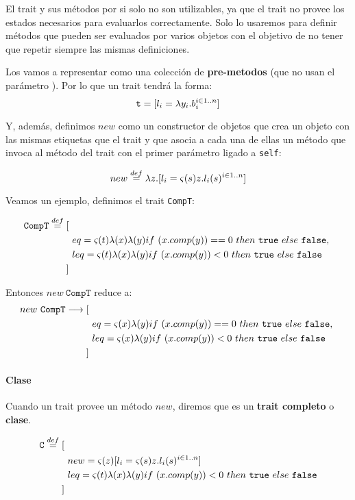 El trait y sus métodos por si solo no son utilizables, ya que el trait no provee los estados necesarios para evaluarlos correctamente. Solo lo usaremos para definir métodos que pueden ser evaluados por varios objetos con el objetivo de no tener que repetir siempre las mismas definiciones.

Los vamos a representar como una colección de \textbf{pre-metodos} (que no usan el parámetro ). Por lo que un trait tendrá la forma:
$$\texttt{t} = [l_i = \lambda y_i. b_i^{i\in 1..n}]$$

Y, además, definimos $new$ como un constructor de objetos que crea un objeto con las mismas etiquetas que el trait y que asocia a cada una de ellas un método que invoca al método del trait con el primer parámetro ligado a \texttt{self}:

$$new \overset{def}{=} \lambda z. [l_i = \varsigma(s)z.l_i(s)^{i\in 1..n}]$$

Veamos un ejemplo, definimos el trait \texttt{CompT}:

\begin{align*}
	\texttt{CompT}\overset{def}{=} [~& \\ &eq = \varsigma(t)\lambda(x)\lambda(y)if~ (x.comp(y)) == 0~ then~ \texttt{true}~ else~ \texttt{false},~\\
	&leq = \varsigma(t)\lambda(x)\lambda(y)if~ (x.comp(y)) < 0~ then~ \texttt{true}~ else~ \texttt{false} \\
	]~&
\end{align*}

Entonces $new~\texttt{CompT}$ reduce a:
\begin{align*}
new~\texttt{CompT}\longrightarrow [~& \\ &eq = \varsigma(x)\lambda(y)if~ (x.comp(y)) == 0~ then~ \texttt{true}~ else~ \texttt{false},~\\
&leq = \varsigma(x)\lambda(y)if~ (x.comp(y)) < 0~ then~ \texttt{true}~ else~ \texttt{false} \\
]~&
\end{align*}

\paragraph{Clase} Cuando un trait provee un método $new$, diremos que es un \textbf{trait completo} o \textbf{clase}.

\begin{align*}
\texttt{C}\overset{def}{=} [~& \\ &new = \varsigma(z)[l_i = \varsigma(s)z.l_i(s)^{i\in 1..n}]~\\
&leq = \varsigma(t)\lambda(x)\lambda(y)if~ (x.comp(y)) < 0~ then~ \texttt{true}~ else~ \texttt{false} \\
]~&
\end{align*}

